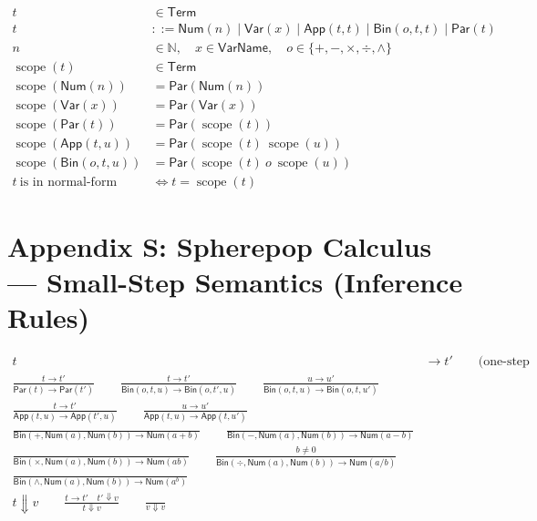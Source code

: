 \documentclass[11pt,oneside]{article}
\begin{document}
\begin{align}
t &\in \mathsf{Term} \\[6pt]
t &::= \mathsf{Num}(n)\mid \mathsf{Var}(x)\mid \mathsf{App}(t,t)\mid \mathsf{Bin}(o,t,t)\mid \mathsf{Par}(t) \\[8pt]
n &\in \mathbb{N},\quad x\in \mathsf{VarName},\quad o\in \{+,-,\times,\div,\wedge\} \\[12pt]

\operatorname{scope}(t) &\in \mathsf{Term} \\[6pt]
\operatorname{scope}(\mathsf{Num}(n)) &= \mathsf{Par}(\mathsf{Num}(n)) \\[4pt]
\operatorname{scope}(\mathsf{Var}(x)) &= \mathsf{Par}(\mathsf{Var}(x)) \\[4pt]
\operatorname{scope}(\mathsf{Par}(t)) &= \mathsf{Par}(\operatorname{scope}(t)) \\[4pt]
\operatorname{scope}(\mathsf{App}(t,u)) &= \mathsf{Par}(\operatorname{scope}(t)\ \operatorname{scope}(u)) \\[4pt]
\operatorname{scope}(\mathsf{Bin}(o,t,u)) &= \mathsf{Par}(\operatorname{scope}(t)\ o\ \operatorname{scope}(u)) \\[12pt]

t \ \text{is in normal-form scopes}
&\Longleftrightarrow
t = \operatorname{scope}(t)
\end{align}

\section{Appendix S: Spherepop Calculus --- Small-Step Semantics (Inference Rules)}

\begin{align}
t &\to t' \qquad \text{(one-step reduction)} \\[12pt]

\frac{t\to t'}{\mathsf{Par}(t)\to \mathsf{Par}(t')}
\qquad
\frac{t\to t'}{\mathsf{Bin}(o,t,u)\to \mathsf{Bin}(o,t',u)}
\qquad
\frac{u\to u'}{\mathsf{Bin}(o,t,u)\to \mathsf{Bin}(o,t,u')}
\\[16pt]

\frac{t\to t'}{\mathsf{App}(t,u)\to \mathsf{App}(t',u)}
\qquad
\frac{u\to u'}{\mathsf{App}(t,u)\to \mathsf{App}(t,u')}
\\[16pt]

\frac{}{\mathsf{Bin}(+, \mathsf{Num}(a), \mathsf{Num}(b)) \to \mathsf{Num}(a+b)}
\qquad
\frac{}{\mathsf{Bin}(-, \mathsf{Num}(a), \mathsf{Num}(b)) \to \mathsf{Num}(a-b)}
\\[14pt]

\frac{}{\mathsf{Bin}(\times, \mathsf{Num}(a), \mathsf{Num}(b)) \to \mathsf{Num}(ab)}
\qquad
\frac{b\neq 0}{\mathsf{Bin}(\div, \mathsf{Num}(a), \mathsf{Num}(b)) \to \mathsf{Num}(a/b)}
\\[14pt]

\frac{}{\mathsf{Bin}(\wedge, \mathsf{Num}(a), \mathsf{Num}(b)) \to \mathsf{Num}(a^b)}
\\[18pt]

t \Downarrow v
\qquad
\frac{t\to t'\quad t'\Downarrow v}{t\Downarrow v}
\qquad
\frac{}{v\Downarrow v}
\end{align}
\end{document}
